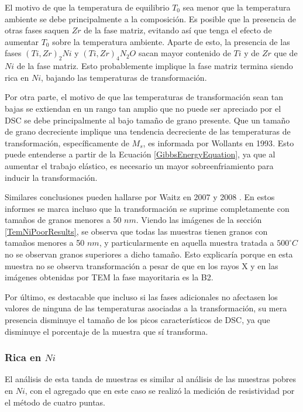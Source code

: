 \documentclass[12pt]{article}
\theoremstyle{definition}
\theoremstyle{remark}
\begin{document}
{El motivo de que la temperatura de equilibrio $T_0$ sea menor que la temperatura ambiente se debe principalmente a la composición. Es posible que la presencia de otras fases saquen $Zr$ de la fase matriz, evitando así que tenga el efecto de aumentar $T_0$ sobre la temperatura ambiente. Aparte de esto, la presencia de las fases $(Ti, Zr)_2 Ni$ y $(Ti, Zr)_4 N_2O$ sacan mayor contenido de $Ti$ y de $Zr$ que de $Ni$ de la fase matriz. Esto probablemente implique la fase matriz termina siendo rica en $Ni$, bajando las temperaturas de transformación.

Por otra parte, el motivo de que las temperaturas de transformación sean tan bajas se extiendan en un rango tan amplio que no puede ser apreciado por el DSC se debe principalmente al bajo tamaño de grano presente. Que un tamaño de grano decreciente implique una tendencia decreciente de las temperaturas de transformación, específicamente de $M_s$, es informada por Wollants en 1993\cite{Wollants1993}. Esto puede entenderse a partir de la Ecuación \ref{GibbsEnergyEquation}, ya que al aumentar el trabajo elástico, es necesario un mayor sobreenfriamiento para inducir la transformación.

Similares conclusiones pueden hallarse por Waitz en 2007 y 2008 \cite{Waitz2007}\cite{Waitz2008}. En estos informes se marca incluso que la transformación se suprime completamente con tamaños de granos menores a 50 $nm$. Viendo las imágenes de la sección \ref{TemNiPoorResults}, se observa que todas las muestras tienen granos con tamaños menores a 50 $nm$, y particularmente en aquella muestra tratada a $500^\circ C$ no se observan granos superiores a dicho tamaño. Esto explicaría porque en esta muestra no se observa transformación a pesar de que en los rayos X y en las imágenes obtenidas por TEM la fase mayoritaria es la B2.

Por último, es destacable que incluso si las fases adicionales no afectasen los valores de ninguna de las temperaturas asociadas a la transformación, su mera presencia disminuye el tamaño de los picos característicos de DSC, ya que disminuye el porcentaje de la muestra que sí transforma.


\subsubsection{Rica en $Ni$}

El análisis de esta tanda de muestras es similar al análisis de las muestras pobres en $Ni$, con el agregado que en este caso se realizó la medición de resistividad por el método de cuatro puntas.

}
\end{document}
